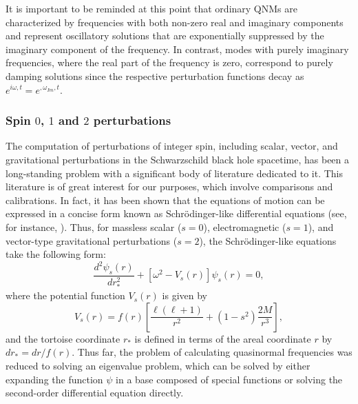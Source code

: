 It is important to be reminded at this point that ordinary QNMs are characterized by frequencies with both non-zero real and imaginary components and represent oscillatory solutions that are exponentially suppressed by the imaginary component of the frequency. In contrast, modes with purely imaginary frequencies, where the real part of the frequency is zero, correspond to purely damping solutions since the respective perturbation functions decay as $ e^{i\omega,t}=e^{,\omega_{Im},t}$.

\subsubsection{Spin $0$, $1$ and $2$ perturbations}

The computation of perturbations of integer spin, including scalar, vector, and gravitational perturbations in the Schwarzschild black hole spacetime, has been a long-standing problem with a significant body of literature dedicated to it. This literature is of great interest for our purposes, which involve comparisons and calibrations. In fact, it has been shown that the equations of motion can be expressed in a concise form known as Schrödinger-like differential equations (see, for instance, \cite{review3}). Thus, for massless scalar ($s=0$), electromagnetic ($s=1$), and vector-type gravitational perturbations ($s=2$), the Schrödinger-like equations take the following form:
%
\begin{equation}\label{Eq:IntegerSpin}
  \frac{d^2 \psi_{{s}}(r)}{d r_*^2}
  +\left[\omega^2-V_{{s}}(r)\right]\psi_{{s}}(r)=0,
\end{equation}
%
where the potential function $V_{s}(r)$ is given by
%
\begin{equation}\label{Eq:IntegerSpinPot}
  V_{s}(r)=f(r)\left[\frac{\ell\left(\ell+1\right)}{r^2}
    +\left(1-s^2\right)\frac{2M}{r^3}\right],
\end{equation}
%
and the tortoise coordinate $r_*$ is defined in terms of the areal coordinate $r$ by $dr_*=dr/f(r)$. Thus far, the problem of calculating quasinormal frequencies was reduced to solving an eigenvalue problem, which can be solved by either expanding the function $\psi$ in a base composed of special functions or solving the second-order differential equation directly.

